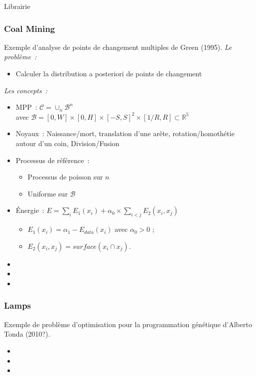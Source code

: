 \documentclass{beamer}
\begin{document}
\begin{frame}{Librairie}
\end{frame}


\begin{frame}
\frametitle{Coal Mining}
Exemple d'analyse de points de changement multiples de Green (1995).
\emph{Le probl\`eme~:} 
\begin{itemize}
\item Calculer la distribution a posteriori de points de changement
\end{itemize}
\emph{Les concepts~:}
\begin{itemize}
\item MPP~:  $\mathcal{C} = \cup_{n}\mathcal{B}^n$\\
avec $\mathcal{B}=[0,W]\times[0,H]\times[-S,S]^2\times[1/R,R] \subset  \mathds{R}^{5}$
\item Noyaux~: Naissance/mort, translation d'une arête, rotation/homothétie autour d'un coin, Division/Fusion
\item Processus de référence~:
\begin{itemize}
\item Processus de poisson sur $n$
\item Uniforme sur $\mathcal{B}$
\end{itemize}
\item \'Energie~: $E = \sum_i E_1(x_i) + \alpha_{0} \times \sum_{i<j} E_2(x_i,x_j)$
\begin{itemize}
\item $E_1(x_i)=\alpha_{1} - E_{data}(x_i)$ avec $\alpha_{0}>0$ ;
\item $E_2(x_i,x_j) = surface(x_i \cap x_j)$.
\end{itemize}
\end{itemize}

\begin{itemize}
\item 
\item 
\item 
\end{itemize}
\end{frame}

\begin{frame}
\frametitle{Lamps}
Exemple de problème d'optimisation pour la programmation génétique d'Alberto Tonda (2010?).
\begin{itemize}
\item 
\item 
\item 
\end{itemize}
\end{frame}
\end{document}
